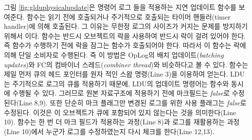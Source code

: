 그림 \ref{fig:glduphysicalupdate}은 명령어 로그 들을 적용하는 지연 업데이트 함수를 보여준다. 
 함수는 읽기 전에 호출되거나 주기적으로 호출되는 타이머 핸들러(timer handler)에 의해
호출된다. 
그 이유는 무한정 로그의 사이즈가 커지는 문제를 방지하기 위해서 이다.
 함수는 반드시 오브젝트의 락을 사용하여 반드시 락이 걸려 있어야 한다.
즉  함수가 수행하기 전에 락을 잠그는 함수가 호출되어야 한다.
따라서 이 함수는 락에 의해 단일 소비자로 수행된다. 즉 이 방법은 OpLog의 배치 
업데이트(\textit{batching updates})와 FC의 컴바이너 스레드(\textit{combiner thread})와 비슷하다고
볼 수 있다.
 함수는 제일 먼저 큐의 헤드 포인터를 원자 적인 스왑 명령(Line 3)을 이용하여 
얻는다.
LDU는 주기적으로 로그의 큐를 적용하기 때문에, LDU의 업데이트 명령어는  함수와 
동시에 수행될 수 있다. 
그러므로 원본 자료구조에 적용하기 전에 마크필드는 \textit{false}로 수정된다(Line 8,9).
또한 단순히 마크 플래그만 변경된 로그를 위한 사용 플래그는 \textit{false}로 수정된다. 
이것은 이 오브젝트가 큐에 포함되어 있지 않는다는 것을 의미한다(Line 10).
 함수는 한 번 더 마크 필드가 적용하는 과정(Line 8)과 로그를 재활용하는 과정(Line
10)에서 누군가 로그를 수정하였는지 다시 체크를 한다(Line 12,13).

